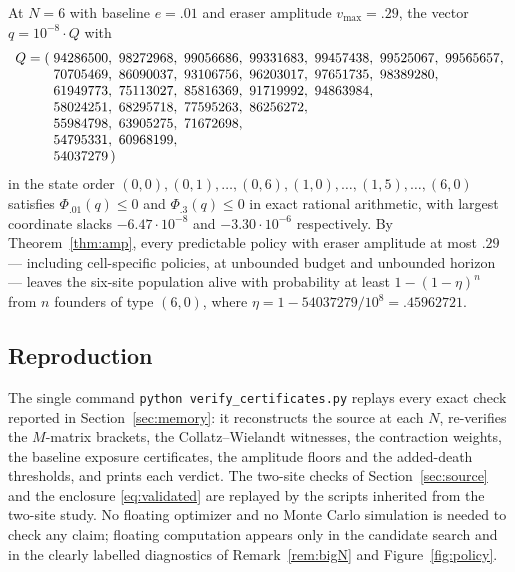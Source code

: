 At $N=6$ with baseline $e=.01$ and eraser amplitude $v_{\max}=.29$, the vector
$q=10^{-8}\cdot Q$ with
\[
\begin{array}{r@{\;}l}
Q=(&94286500,\ 98272968,\ 99056686,\ 99331683,\ 99457438,\ 99525067,\ 99565657,\\
   &70705469,\ 86090037,\ 93106756,\ 96203017,\ 97651735,\ 98389280,\\
   &61949773,\ 75113027,\ 85816369,\ 91719992,\ 94863984,\\
   &58024251,\ 68295718,\ 77595263,\ 86256272,\\
   &55984798,\ 63905275,\ 71672698,\\
   &54795331,\ 60968199,\\
   &54037279\,)
\end{array}
\]
in the state order $(0,0),(0,1),\dots,(0,6),(1,0),\dots,(1,5),\dots,(6,0)$
satisfies $\Phi_{.01}(q)\le0$ and $\Phi_{.3}(q)\le0$ in exact rational
arithmetic, with largest coordinate slacks $-6.47\cdot10^{-8}$ and
$-3.30\cdot10^{-6}$ respectively. By Theorem~\ref{thm:amp}, every predictable
policy with eraser amplitude at most $.29$ --- including cell-specific policies,
at unbounded budget and unbounded horizon --- leaves the six-site population
alive with probability at least $1-(1-\eta)^n$ from $n$ founders of type
$(6,0)$, where $\eta=1-54037279/10^8=.45962721$.

\subsection{Reproduction}

The single command \texttt{python verify\_certificates.py} replays every exact
check reported in Section~\ref{sec:memory}: it reconstructs the source at each
$N$, re-verifies the $M$-matrix brackets, the Collatz--Wielandt witnesses, the
contraction weights, the baseline exposure certificates, the amplitude floors
and the added-death thresholds, and prints each verdict. The two-site checks of
Section~\ref{sec:source} and the enclosure \eqref{eq:validated} are replayed by
the scripts inherited from the two-site study. No floating optimizer and no
Monte Carlo simulation is needed to check any claim; floating computation
appears only in the candidate search and in the clearly labelled diagnostics of
Remark~\ref{rem:bigN} and Figure~\ref{fig:policy}.
